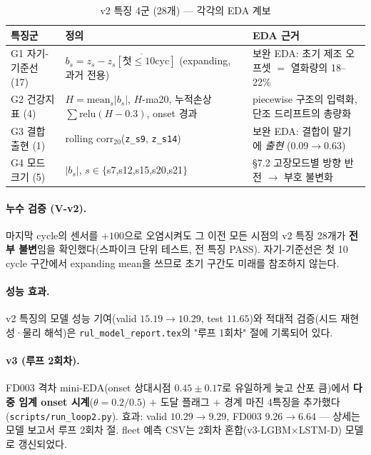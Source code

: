 \documentclass[11pt]{article}
\begin{document}
\begin{table}[H]
\centering
\caption{v2 특징 4군 (28개) — 각각의 EDA 계보}
\label{tab:v2feat}
\begin{tabular}{p{3.4cm}p{5.2cm}p{5.2cm}}
\toprule
특징군 & 정의 & EDA 근거 \\
\midrule
G1 자기-기준선 (17) & $b_s = z_s - \overline{z_s[\text{첫}\le10\text{cyc}]}$ (expanding, 과거 전용) & 보완 EDA: 초기 제조 오프셋 $=$ 열화량의 18--22\% \\
G2 건강지표 (4) & $H=\mathrm{mean}_s|b_s|$, $H$-ma20, 누적손상 $\sum\mathrm{relu}(H{-}0.3)$, onset 경과 & piecewise 구조의 입력화, 단조 드리프트의 총량화 \\
G3 결합 출현 (1) & rolling corr$_{20}$(\texttt{z\_s9}, \texttt{z\_s14}) & 보완 EDA: 결합이 말기에 \emph{출현} (0.09$\to$0.63) \\
G4 모드 크기 (5) & $|b_s|$, $s\in\{$s7,s12,s15,s20,s21$\}$ & \S7.2 고장모드별 방향 반전 $\to$ 부호 불변화 \\
\bottomrule
\end{tabular}
\end{table}

\paragraph{누수 검증 (V-v2).}
마지막 cycle의 센서를 $+100$으로 오염시켜도 그 이전 모든 시점의 v2 특징 28개가 \textbf{전부 불변}임을 확인했다(스파이크 단위 테스트, 전 특징 PASS).
자기-기준선은 첫 10 cycle 구간에서 expanding mean을 쓰므로 초기 구간도 미래를 참조하지 않는다.

\paragraph{성능 효과.}
v2 특징의 모델 성능 기여(valid $15.19 \to 10.29$, test $11.65$)와 적대적 검증(시드 재현성·물리 해석)은 \texttt{rul\_model\_report.tex}의 "루프 1회차" 절에 기록되어 있다.

\paragraph{v3 (루프 2회차).}
FD003 격차 mini-EDA(onset 상대시점 $0.45\pm0.17$로 유일하게 늦고 산포 큼)에서
\textbf{다중 임계 onset 시계}($\theta{=}0.2/0.5$) $+$ 도달 플래그 $+$ 경계 마진 4특징을 추가했다(\texttt{scripts/run\_loop2.py}).
효과: valid $10.29\to9.29$, FD003 $9.26\to6.64$ — 상세는 모델 보고서 루프 2회차 절.
fleet 예측 CSV는 2회차 혼합(v3-LGBM$\times$LSTM-D) 모델로 갱신되었다.
\end{document}
